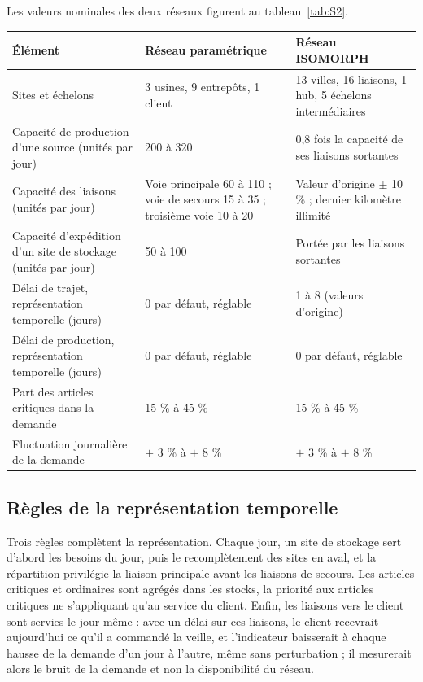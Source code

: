 Les valeurs nominales des deux réseaux figurent au tableau~\ref{tab:S2}.

\begin{center}\begin{minipage}{\textwidth}
\label{tab:S2}
\footnotesize
\begin{tabularx}{\textwidth}{@{}LLL@{}}
\toprule
\textbf{Élément} & \textbf{Réseau paramétrique} & \textbf{Réseau ISOMORPH} \\
\midrule
Sites et échelons & 3 usines, 9 entrepôts, 1 client & 13 villes, 16 liaisons, 1 hub, 5 échelons intermédiaires \\
Capacité de production d'une source (unités par jour) & 200 à 320 & 0,8 fois la capacité de ses liaisons sortantes \\
Capacité des liaisons (unités par jour) & Voie principale 60 à 110 ; voie de secours 15 à 35 ; troisième voie 10 à 20 & Valeur d'origine $\pm$ 10 \% ; dernier kilomètre illimité \\
Capacité d'expédition d'un site de stockage (unités par jour) & 50 à 100 & Portée par les liaisons sortantes \\
Délai de trajet, représentation temporelle (jours) & 0 par défaut, réglable & 1 à 8 (valeurs d'origine) \\
Délai de production, représentation temporelle (jours) & 0 par défaut, réglable & 0 par défaut, réglable \\
Part des articles critiques dans la demande & 15 \% à 45 \% & 15 \% à 45 \% \\
Fluctuation journalière de la demande & $\pm$ 3 \% à $\pm$ 8 \% & $\pm$ 3 \% à $\pm$ 8 \% \\
\bottomrule
\end{tabularx}
\end{minipage}\end{center}

\subsection*{Règles de la représentation temporelle}

Trois règles complètent la représentation. Chaque jour, un site de stockage sert d'abord les besoins du jour, puis le recomplètement des sites en aval, et la répartition privilégie la liaison principale avant les liaisons de secours. Les articles critiques et ordinaires sont agrégés dans les stocks, la priorité aux articles critiques ne s'appliquant qu'au service du client. Enfin, les liaisons vers le client sont servies le jour même : avec un délai sur ces liaisons, le client recevrait aujourd'hui ce qu'il a commandé la veille, et l'indicateur baisserait à chaque hausse de la demande d'un jour à l'autre, même sans perturbation ; il mesurerait alors le bruit de la demande et non la disponibilité du réseau.

